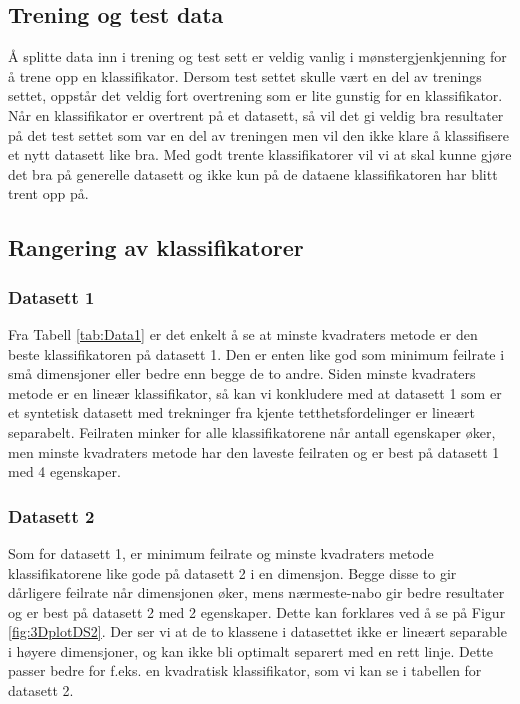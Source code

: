 \documentclass[twocolumn,norwegian]{article}
\begin{document}
\subsection{Trening og test data}
Å splitte data inn i trening og test sett er veldig vanlig i mønstergjenkjenning for å trene opp en klassifikator. Dersom test settet skulle vært en del av trenings settet, oppstår det veldig fort overtrening som er lite gunstig for en klassifikator. Når en klassifikator er overtrent på et datasett, så vil det gi veldig bra resultater på det test settet som var en del av treningen men vil den ikke klare å klassifisere et nytt datasett like bra. Med godt trente klassifikatorer vil vi at skal kunne gjøre det bra på generelle datasett og ikke kun på de dataene klassifikatoren har blitt trent opp på. 

\subsection{Rangering av klassifikatorer}
\subsubsection{Datasett 1}
Fra Tabell \ref{tab:Data1} er det enkelt å se at minste kvadraters metode er den beste klassifikatoren på datasett 1. Den er enten like god som minimum feilrate i små dimensjoner eller bedre enn begge de to andre. Siden minste kvadraters metode er en lineær klassifikator, så kan vi konkludere med at datasett 1 som er et syntetisk datasett med trekninger fra kjente tetthetsfordelinger er lineært separabelt. Feilraten minker for alle klassifikatorene når antall egenskaper øker, men minste kvadraters metode har den laveste feilraten og er best på datasett 1 med 4 egenskaper.

\subsubsection{Datasett 2}
Som for datasett 1, er minimum feilrate og minste kvadraters metode klassifikatorene like gode på datasett 2 i en dimensjon. Begge disse to gir dårligere feilrate når dimensjonen øker, mens nærmeste-nabo gir bedre resultater og er best på datasett 2 med 2 egenskaper. Dette kan forklares ved å se på Figur \ref{fig:3DplotDS2}. Der ser vi at de to klassene i datasettet ikke er lineært separable i høyere dimensjoner, og kan ikke bli optimalt separert med en rett linje. Dette passer bedre for f.eks. en kvadratisk klassifikator, som vi kan se i tabellen for datasett 2.
\end{document}
